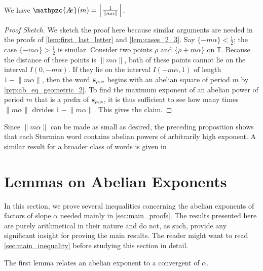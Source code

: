 \documentclass[a4paper,fleqn]{article}
\providecommand{\norm}[1]{\lVert#1\rVert}
\providecommand{\Floor}[1]{\left\lfloor#1\right\rfloor}
\newcommand{\infw}[1]{%
  \ifcat\noexpand#1\relax\bm{#1}%
  \else\mathbf{#1}\fi}          %
\newcommand{\abexp}[2][]{\mathpzc{A\mkern-3mu e}_{#1}(#2)}
\newcommand{\T}{\mathbb{T}}
\begin{document}
  \begin{proposition}\label{prp:exp_formula} \cite[Thm.~4.7]{2016:abelian_powers_and_repetitions_in_sturmian_words}
    We have $\abexp{m} = \Floor{\tfrac{1}{\norm{m\alpha}}}$.
  \end{proposition}
  \begin{proof}[Proof Sketch]
    We sketch the proof here because similar arguments are needed in the proofs of
    \autoref{lem:first_last_letter} and \autoref{lem:cases_2_3}. Say $\{-m\alpha\} < \tfrac12$; the case
    $\{-m\alpha\} > \tfrac12$ is similar. Consider two points $\rho$ and $\{\rho + m\alpha\}$ on $\T$. Because the
    distance of these points is $\norm{m\alpha}$, both of these points cannot lie on the interval $I(0, -m\alpha)$. If
    they lie on the interval $I(-m\alpha, 1)$ of length $1 - \norm{m\alpha}$, then the word $\infw{s}_{\rho,\alpha}$
    begins with an abelian square of period $m$ by \autoref{prp:ab_eq_geometric_2}. To find the maximum exponent of an
    abelian power of period $m$ that is a prefix of $\infw{s}_{\rho,\alpha}$, it is thus sufficient to see how many
    times $\norm{m\alpha}$ divides $1 - \norm{m\alpha}$. This gives the claim.
  \end{proof}

  Since $\norm{m\alpha}$ can be made as small as desired, the preceding proposition shows that each Sturmian word
  contains abelian powers of arbitrarily high exponent. A similar result for a broader class of words is given in
  \cite[Thm.~1.8]{2011:abelian_complexity_of_minimal_subshifts}.

  \section{Lemmas on Abelian Exponents}\label{sec:abelian_exponents}
  In this section, we prove several inequalities concerning the abelian exponents of factors of slope $\alpha$ needed
  mainly in \autoref{sec:main_proofs}. The results presented here are purely arithmetical in their nature and do not,
  as such, provide any significant insight for proving the main results. The reader might want to read
  \autoref{sec:main_inequality} before studying this section in detail.

  The first lemma relates an abelian exponent to a convergent of $\alpha$.
\end{document}
